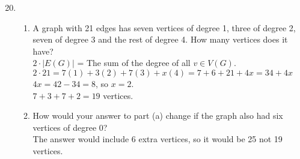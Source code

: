 \documentclass[12pt]{article}
\begin{document}
\begin{enumerate}
\setcounter{enumi}{19}
\item 
	\begin{enumerate}
	\item A graph with 21 edges has seven vertices of degree 1, three of degree 2, seven of degree 3 and the rest of degree 4. 
	How many vertices does it have?\\
		$2\cdot |E(G)|$ = The sum of the degree of all $v\in V(G)$.\\
		$2\cdot 21 = 7(1)+3(2)+7(3)+x(4)=7+6+21+4x=34+4x$\\
		$4x=42-34=8$, so $x=2$.\\
		$7+3+7+2=19$ vertices.
	\item How would your answer to part (a) change if the graph also had six vertices of degree 0?\\
		The answer would include 6 extra vertices, so it would be 25 not 19 vertices.
	\end{enumerate}


\end{enumerate}
\end{document}
